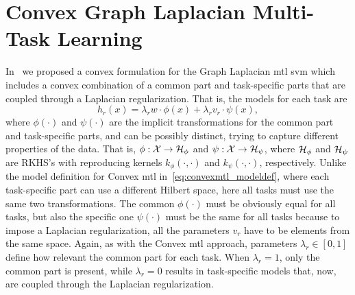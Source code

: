 \section{Convex Graph Laplacian Multi-Task Learning}



In~\cite{RuizAD21_hais} we proposed a convex formulation for the Graph Laplacian \acrshort{mtl} \acrshort{svm} which includes a convex combination of a common part and task-specific parts that are coupled through a Laplacian regularization.
That is, the models for each task are
\begin{equation}
    \nonumber
    h_r(x) = \lambda_r w \cdot \phi(x) + \lambda_r v_r \cdot \psi(x) ,
\end{equation}
where $\phi(\cdot)$ and $\psi(\cdot)$ are the implicit transformations for the common part and task-specific parts, and can be possibly distinct, trying to capture different properties of the data.
That is, $\phi: \mathcal{X} \to \mathcal{H}_\phi$ and $\psi: \mathcal{X} \to \mathcal{H}_\psi$, where $\mathcal{H}_\phi$ and $\mathcal{H}_\psi$ are RKHS's with reproducing kernels $k_\phi(\cdot, \cdot)$ and $k_\psi(\cdot, \cdot)$, respectively.
Unlike the model definition for Convex \acrshort{mtl} in~\eqref{eq:convexmtl_modeldef}, where each task-specific part can use a different Hilbert space, here all tasks must use the same two transformations. The common $\phi(\cdot)$ must be obviously equal for all tasks, but also the specific one $\psi(\cdot)$ must be the same for all tasks because to impose a Laplacian regularization, all the parameters $v_r$ have to be elements from the same space.
Again, as with the Convex \acrshort{mtl} approach, parameters $\lambda_r \in [0, 1]$ define how relevant the common part for each task. When $\lambda_r=1$, only the common part is present, while $\lambda_r=0$ results in task-specific models that, now, are coupled through the Laplacian regularization.

